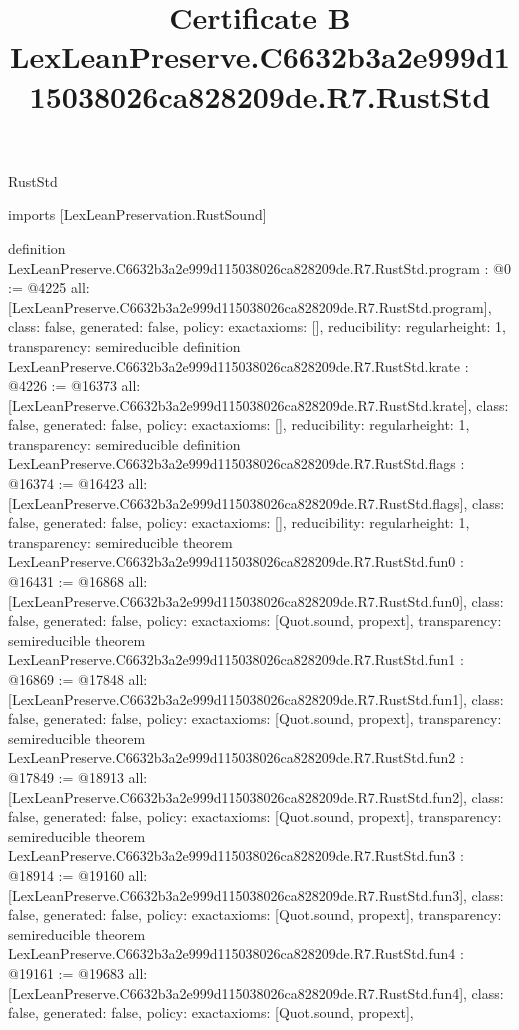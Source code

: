 \begin{lexlean}{RustStd}
\title{Certificate B LexLeanPreserve.C6632b3a2e999d115038026ca828209de.R7.RustStd}
\begin{coremodule}
imports [LexLeanPreservation.RustSound]

definition LexLeanPreserve.C6632b3a2e999d115038026ca828209de.R7.RustStd.program : @0 := @4225 {
  all: [LexLeanPreserve.C6632b3a2e999d115038026ca828209de.R7.RustStd.program],
  class: false,
  generated: false,
  policy: exact{axioms: []},
  reducibility: regular{height: 1},
  transparency: semireducible
}
definition LexLeanPreserve.C6632b3a2e999d115038026ca828209de.R7.RustStd.krate : @4226 := @16373 {
  all: [LexLeanPreserve.C6632b3a2e999d115038026ca828209de.R7.RustStd.krate],
  class: false,
  generated: false,
  policy: exact{axioms: []},
  reducibility: regular{height: 1},
  transparency: semireducible
}
definition LexLeanPreserve.C6632b3a2e999d115038026ca828209de.R7.RustStd.flags : @16374 := @16423 {
  all: [LexLeanPreserve.C6632b3a2e999d115038026ca828209de.R7.RustStd.flags],
  class: false,
  generated: false,
  policy: exact{axioms: []},
  reducibility: regular{height: 1},
  transparency: semireducible
}
theorem LexLeanPreserve.C6632b3a2e999d115038026ca828209de.R7.RustStd.fun0 : @16431 := @16868 {
  all: [LexLeanPreserve.C6632b3a2e999d115038026ca828209de.R7.RustStd.fun0],
  class: false,
  generated: false,
  policy: exact{axioms: [Quot.sound, propext]},
  transparency: semireducible
}
theorem LexLeanPreserve.C6632b3a2e999d115038026ca828209de.R7.RustStd.fun1 : @16869 := @17848 {
  all: [LexLeanPreserve.C6632b3a2e999d115038026ca828209de.R7.RustStd.fun1],
  class: false,
  generated: false,
  policy: exact{axioms: [Quot.sound, propext]},
  transparency: semireducible
}
theorem LexLeanPreserve.C6632b3a2e999d115038026ca828209de.R7.RustStd.fun2 : @17849 := @18913 {
  all: [LexLeanPreserve.C6632b3a2e999d115038026ca828209de.R7.RustStd.fun2],
  class: false,
  generated: false,
  policy: exact{axioms: [Quot.sound, propext]},
  transparency: semireducible
}
theorem LexLeanPreserve.C6632b3a2e999d115038026ca828209de.R7.RustStd.fun3 : @18914 := @19160 {
  all: [LexLeanPreserve.C6632b3a2e999d115038026ca828209de.R7.RustStd.fun3],
  class: false,
  generated: false,
  policy: exact{axioms: [Quot.sound, propext]},
  transparency: semireducible
}
theorem LexLeanPreserve.C6632b3a2e999d115038026ca828209de.R7.RustStd.fun4 : @19161 := @19683 {
  all: [LexLeanPreserve.C6632b3a2e999d115038026ca828209de.R7.RustStd.fun4],
  class: false,
  generated: false,
  policy: exact{axioms: [Quot.sound, propext]},
}
\end{coremodule}
\end{lexlean}
